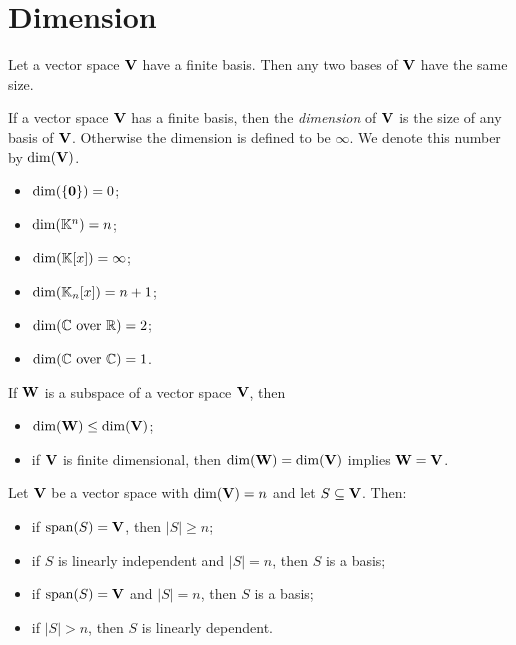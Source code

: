 \section{Dimension}

\begin{theorem}
Let a vector space $\mathbf{V}$ have a finite basis. Then any two bases of $\mathbf{V}$ have the same size.
\end{theorem}

\begin{definition}
If a vector space $\mathbf{V}$ has a finite basis, then the \emph{dimension} of $\mathbf{V}$ is the size of any basis of $\mathbf{V}$.
Otherwise the dimension is defined to be $\infty$. We denote this number by $\dim(\mathbf{V})$.
\end{definition}

\begin{example}
\hfill
\begin{itemize}
\item $\dim(\{ \mathbf{0}\}) = 0$;
\item $\dim( \mathbb{K}^n) = n$;
\item $\dim(\mathbb{K}[x])=\infty$;
\item $\dim(\mathbb{K}_n[x])=n+1$;
\item $\dim(\mathbb{C} \text{ over } \mathbb{R})=2$;
\item $\dim(\mathbb{C} \text{ over } \mathbb{C})=1$.
\end{itemize}
\end{example}

\begin{theorem}
If $\mathbf{W}$ is a subspace of a vector space $\mathbf{V}$, then
\begin{itemize}
\item $\dim(\mathbf{W}) \leq \dim(\mathbf{V})$;
\item if $\mathbf{V}$ is finite dimensional, then $\dim(\mathbf{W}) = \dim(\mathbf{V})$ implies $\mathbf{W}=\mathbf{V}$.
\end{itemize}
\end{theorem}

\begin{theorem}
Let $\mathbf{V}$ be a vector space with $\dim(\mathbf{V})=n$ and let $S\subseteq \mathbf{V}$. Then:
\begin{itemize}
\item if $\operatorname{span}\!\left(S\right)=\mathbf{V}$, then $|S|\geq n$;
\item if $S$ is linearly independent and $|S|=n$, then $S$ is a basis;
\item if $\operatorname{span}\!\left(S\right)=\mathbf{V}$ and $|S|=n$, then $S$ is a basis;
\item if $|S|>n$, then $S$ is linearly dependent.
\end{itemize}
\end{theorem}

